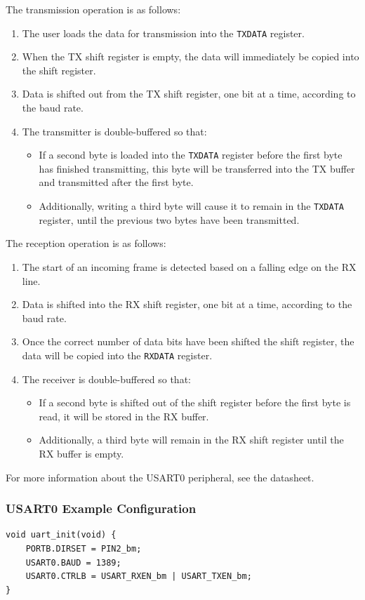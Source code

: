 \documentclass{report}
\begin{document}
The transmission operation is as follows:
\begin{enumerate}
    \item The user loads the data for transmission into the \texttt{TXDATA} register.
    \item When the TX shift register is empty, the data will immediately be copied into the shift register.
    \item Data is shifted out from the TX shift register, one bit at a time, according to the baud rate.
    \item The transmitter is double-buffered so that:
          \begin{itemize}
              \item If a second byte is loaded into the \texttt{TXDATA} register before the first byte has finished transmitting,
                    this byte will be transferred into the TX buffer and transmitted after the first byte.
              \item Additionally, writing a third byte will cause it to remain in the \texttt{TXDATA} register, until the previous two bytes have been transmitted.
          \end{itemize}
\end{enumerate}
The reception operation is as follows:
\begin{enumerate}
    \item The start of an incoming frame is detected based on a falling edge on the RX line.
    \item Data is shifted into the RX shift register, one bit at a time, according to the baud rate.
    \item Once the correct number of data bits have been shifted the shift register, the data will be copied into the
          \texttt{RXDATA} register.
    \item The receiver is double-buffered so that:
          \begin{itemize}
              \item If a second byte is shifted out of the shift register before the first byte is read, it will be stored in the RX buffer.
              \item Additionally, a third byte will remain in the RX shift register until the RX buffer is empty.
          \end{itemize}
\end{enumerate}
For more information about the USART0 peripheral, see the datasheet.
\subsubsection{USART0 Example Configuration}
\begin{verbatim}
void uart_init(void) {
    PORTB.DIRSET = PIN2_bm;
    USART0.BAUD = 1389;
    USART0.CTRLB = USART_RXEN_bm | USART_TXEN_bm;
}
\end{verbatim}
\end{document}
